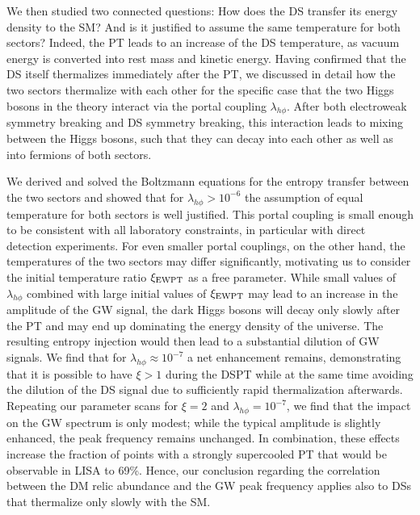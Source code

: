 We then studied two connected questions: How does the \ac{DS} transfer its energy density to the \ac{SM}? And is it justified to assume the same temperature for both sectors? Indeed, the \ac{PT} leads to an increase of the \ac{DS} temperature, as vacuum
energy is converted into rest mass and kinetic energy. Having confirmed that the \ac{DS} itself thermalizes immediately after the \ac{PT}, we discussed in detail how the two sectors thermalize with  each other for the specific case that the two Higgs bosons in the theory interact via the portal coupling $\lambda_{h\phi}$. After both electroweak symmetry breaking and \ac{DS} symmetry breaking, this interaction leads to mixing between the Higgs bosons, such that they can decay into each other as well as into fermions of both sectors.

We derived and solved the Boltzmann equations for the entropy transfer between the two sectors and showed that for $\lambda_{h\phi} > 10^{-6}$ the assumption of equal temperature for both sectors is well justified. This portal coupling is small enough to be consistent with all laboratory constraints, in particular with direct detection experiments. For even smaller portal couplings, on the other hand, the temperatures of the two sectors may differ significantly, motivating us to consider the initial temperature ratio $\xi_{\text{EWPT}}$ as a free parameter. While small values of $\lambda_{h\phi}$ combined with large initial values of $\xi_{\text{EWPT}}$ may lead to an increase in the amplitude of the \ac{GW} signal, the dark Higgs bosons will decay  only slowly after the \ac{PT} and may end up dominating the energy density of the universe. The resulting entropy injection would then lead to a substantial dilution of \ac{GW} signals. We find that for $\lambda_{h\phi} \approx 10^{-7}$ a net enhancement remains, demonstrating that it is possible to have $\xi > 1$ during the \ac{DSPT} while at the same time avoiding the dilution of the \ac{DS} signal due to sufficiently rapid thermalization afterwards. Repeating our parameter scans for $\xi = 2$ and $\lambda_{h\phi} = 10^{-7}$, we find that the impact on the \ac{GW} spectrum is only modest; while the typical amplitude is slightly enhanced, the peak frequency remains unchanged. In combination, these effects increase the fraction of points with a strongly supercooled  \ac{PT} that would be observable in \ac{LISA} to 69\%. Hence, our conclusion regarding the correlation between the \ac{DM} relic abundance and the \ac{GW} peak frequency applies also to \acp{DS} that thermalize only slowly with the \ac{SM}.

